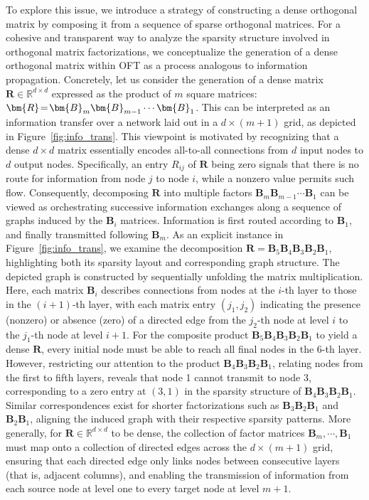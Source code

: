 To explore this issue, we introduce a strategy of constructing a dense orthogonal matrix by composing it from a sequence of sparse orthogonal matrices. For a cohesive and transparent way to analyze the sparsity structure involved in orthogonal matrix factorizations, we conceptualize the generation of a dense orthogonal matrix within OFT as a process analogous to information propagation. Concretely, let us consider the generation of a dense matrix $\bm{R}\in\mathbb{R}^{d\times d}$ expressed as the product of $m$ square matrices: $\thickmuskip=2mu \medmuskip=2mu \bm{R}=\bm{B}_m\bm{B}_{m-1}\cdots\bm{B}_1$. This can be interpreted as an information transfer over a network laid out in a $d\times (m+1)$ grid, as depicted in Figure~\ref{fig:info_trans}. This viewpoint is motivated by recognizing that a dense $d\times d$ matrix essentially encodes all-to-all connections from $d$ input nodes to $d$ output nodes. Specifically, an entry $R_{ij}$ of $\bm{R}$ being zero signals that there is no route for information from node $j$ to node $i$, while a nonzero value permits such flow. Consequently, decomposing $\bm{R}$ into multiple factors $\bm{B}_m\bm{B}_{m-1}\cdots\bm{B}_1$ can be viewed as orchestrating successive information exchanges along a sequence of graphs induced by the $\bm{B}_i$ matrices. Information is first routed according to $\bm{B}_1$, and finally transmitted following $\bm{B}_m$. As an explicit instance in Figure~\ref{fig:info_trans}, we examine the decomposition $\bm{R}=\bm{B}_5\bm{B}_4\bm{B}_3\bm{B}_2\bm{B}_1$, highlighting both its sparsity layout and corresponding graph structure. The depicted graph is constructed by sequentially unfolding the matrix multiplication. Here, each matrix $\bm{B}_i$ describes connections from nodes at the $i$-th layer to those in the $(i+1)$-th layer, with each matrix entry $(j_1,j_2)$ indicating the presence (nonzero) or absence (zero) of a directed edge from the $j_2$-th node at level $i$ to the $j_1$-th node at level $i+1$. For the composite product $\bm{B}_5\bm{B}_4\bm{B}_3\bm{B}_2\bm{B}_1$ to yield a dense $\bm{R}$, every initial node must be able to reach all final nodes in the $6$-th layer. However, restricting our attention to the product $\bm{B}_4\bm{B}_3\bm{B}_2\bm{B}_1$, relating nodes from the first to fifth layers, reveals that node 1 cannot transmit to node 3, corresponding to a zero entry at $(3,1)$ in the sparsity structure of $\bm{B}_4\bm{B}_3\bm{B}_2\bm{B}_1$. Similar correspondences exist for shorter factorizations such as $\bm{B}_3\bm{B}_2\bm{B}_1$ and $\bm{B}_2\bm{B}_1$, aligning the induced graph with their respective sparsity patterns. More generally, for $\bm{R}\in\mathbb{R}^{d\times d}$ to be dense, the collection of factor matrices $\bm{B}_m,\cdots,\bm{B}_1$ must map onto a collection of directed edges across the $d\times (m+1)$ grid, ensuring that each directed edge only links nodes between consecutive layers (that is, adjacent columns), and enabling the transmission of information from each source node at level one to every target node at level $m+1$.

